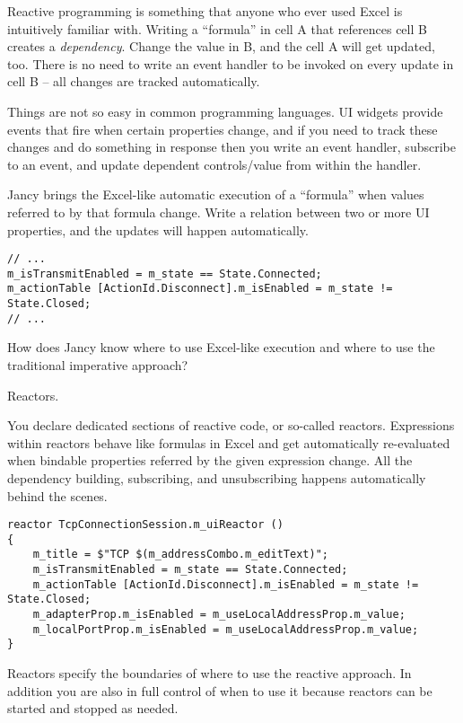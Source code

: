 \documentclass[oneside]{book}
\begin{document}
Reactive programming is something that anyone who ever used Excel is intuitively familiar with. Writing a “formula” in cell A that references cell B creates a \emph{dependency}. Change the value in B, and the cell A will get updated, too. There is no need to write an event handler to be invoked on every update in cell B -- all changes are tracked automatically.

Things are not so easy in common programming languages. UI widgets provide events that fire when certain properties change, and if you need to track these changes and do something in response then you write an event handler, subscribe to an event, and update dependent controls/value from within the handler.

Jancy brings the Excel-like automatic execution of a “formula” when values referred to by that formula change. Write a relation between two or more UI properties, and the updates will happen automatically.

\begin{lstlisting}
// ...  
m_isTransmitEnabled = m_state == State.Connected;
m_actionTable [ActionId.Disconnect].m_isEnabled = m_state != State.Closed;
// ...
\end{lstlisting}

How does Jancy know where to use Excel-like execution and where to use the traditional imperative approach?

Reactors.

You declare dedicated sections of reactive code, or so-called reactors. Expressions within reactors behave like formulas in Excel and get automatically re-evaluated when bindable properties referred by the given expression change. All the dependency building, subscribing, and unsubscribing happens automatically behind the scenes.

\begin{lstlisting}
reactor TcpConnectionSession.m_uiReactor ()
{
    m_title = $"TCP $(m_addressCombo.m_editText)";
    m_isTransmitEnabled = m_state == State.Connected;
    m_actionTable [ActionId.Disconnect].m_isEnabled = m_state != State.Closed;
    m_adapterProp.m_isEnabled = m_useLocalAddressProp.m_value;
    m_localPortProp.m_isEnabled = m_useLocalAddressProp.m_value;
}
\end{lstlisting}

Reactors specify the boundaries of where to use the reactive approach. In addition you are also in full control of when to use it because reactors can be started and stopped as needed.
\end{document}
